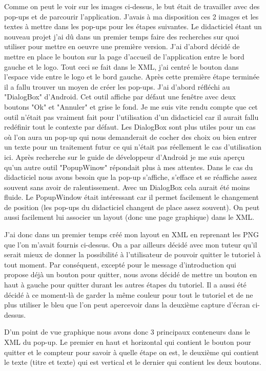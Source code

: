 Comme on peut le voir sur les images ci-dessus, le but était de travailler avec des pop-ups et de parcourir l'application. J'avais à ma disposition ces 2 images et les textes à mettre dans les pop-ups pour les étapes suivantes. Le didacticiel étant un nouveau projet j'ai dû dans un premier temps faire des recherches sur quoi utiliser pour mettre en oeuvre une première version. J'ai d'abord décidé de mettre en place le bouton sur la page d'accueil de l'application entre le bord gauche et le logo. Tout ceci se fait dans le XML, j'ai centré le bouton dans l'espace vide entre le logo et le bord gauche. Après cette première étape terminée il a fallu trouver un moyen de créer les pop-ups. J'ai d'abord réfléchi au "DialogBox" d'Android. Cet outil affiche par défaut une fenêtre avec deux boutons "Ok" et "Annuler" et grise le fond. Je me suis vite rendu compte que cet outil n'était pas vraiment fait pour l'utilisation d'un didacticiel car il aurait fallu redéfinir tout le contexte par défaut. Les DialogBox sont plus utiles pour un cas où l'on aura un pop-up qui nous demanderait de cocher des choix ou bien entrer un texte pour un traitement futur ce qui n'était pas réellement le cas d'utilisation ici. Après recherche sur le guide de développeur d'Android je me suis aperçu qu'un autre outil "PopupWinow" répondait plus à mes attentes. Dans le cas du didacticiel nous avons besoin que la pop-up s'affiche, s'efface et se réaffiche assez souvent sans avoir de ralentissement. Avec un DialogBox cela aurait été moins fluide. Le PopupWindow était intéressant car il permet facilement le changement de position (les pop-ups du didacticiel changent de place assez souvent). On peut aussi facilement lui associer un layout (donc une page graphique) dans le XML.

J'ai donc dans un premier temps créé mon layout en XML en reprenant les PNG que l'on m'avait fournis ci-dessus. On a par ailleurs décidé avec mon tuteur qu'il serait mieux de donner la possibilité à l'utilisateur de pouvoir quitter le tutoriel à tout moment. Par conséquent, excepté pour le message d'introduction qui propose déjà un bouton pour quitter, nous avons décidé de mettre un bouton en haut à gauche pour quitter durant les autres étapes du tutoriel. Il a aussi été décidé à ce moment-là de garder la même couleur pour tout le tutoriel et de ne plus utiliser le bleu que l'on peut apercevoir dans la deuxième capture d'écran ci-dessus.

D'un point de vue graphique nous avons donc 3 principaux conteneurs dans le XML du pop-up. Le premier en haut et horizontal qui contient le bouton pour quitter et le compteur pour savoir à quelle étape on est, le deuxième qui contient le texte (titre et texte) qui est vertical et le dernier qui contient les deux boutons.

